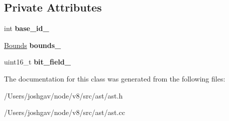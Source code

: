 \subsection*{Private Attributes}
\begin{DoxyCompactItemize}
\item 
int {\bfseries base\+\_\+id\+\_\+}\hypertarget{classv8_1_1internal_1_1_expression_a4ccf3dc0cda42ad49ef3de136b3b77a9}{}\label{classv8_1_1internal_1_1_expression_a4ccf3dc0cda42ad49ef3de136b3b77a9}

\item 
\hyperlink{structv8_1_1internal_1_1_bounds}{Bounds} {\bfseries bounds\+\_\+}\hypertarget{classv8_1_1internal_1_1_expression_aa0aa39d04dddaaa34dac30fa933f7ef0}{}\label{classv8_1_1internal_1_1_expression_aa0aa39d04dddaaa34dac30fa933f7ef0}

\item 
uint16\+\_\+t {\bfseries bit\+\_\+field\+\_\+}\hypertarget{classv8_1_1internal_1_1_expression_a05d9d55c565d2df1ce67d413e7f54c2f}{}\label{classv8_1_1internal_1_1_expression_a05d9d55c565d2df1ce67d413e7f54c2f}

\end{DoxyCompactItemize}


The documentation for this class was generated from the following files\+:\begin{DoxyCompactItemize}
\item 
/\+Users/joshgav/node/v8/src/ast/ast.\+h\item 
/\+Users/joshgav/node/v8/src/ast/ast.\+cc\end{DoxyCompactItemize}
